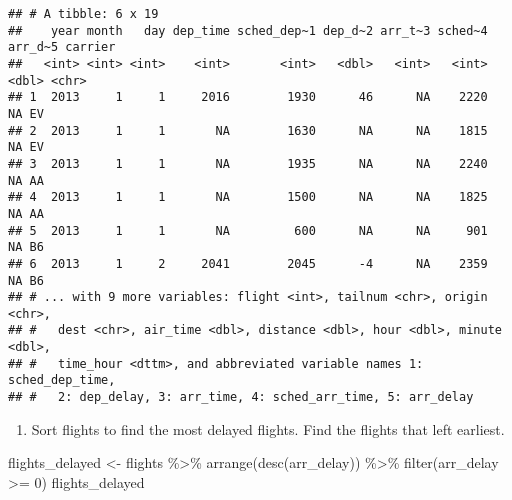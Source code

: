 \documentclass[
]{article}
\newenvironment{Shaded}{\begin{snugshade}}{\end{snugshade}}
\newcommand{\DecValTok}[1]{\textcolor[rgb]{0.00,0.00,0.81}{#1}}
\newcommand{\FunctionTok}[1]{\textcolor[rgb]{0.00,0.00,0.00}{#1}}
\newcommand{\NormalTok}[1]{#1}
\newcommand{\OtherTok}[1]{\textcolor[rgb]{0.56,0.35,0.01}{#1}}
\newcommand{\SpecialCharTok}[1]{\textcolor[rgb]{0.00,0.00,0.00}{#1}}
\providecommand{\tightlist}{%
  \setlength{\itemsep}{0pt}\setlength{\parskip}{0pt}}
\begin{document}
\begin{verbatim}
## # A tibble: 6 x 19
##    year month   day dep_time sched_dep~1 dep_d~2 arr_t~3 sched~4 arr_d~5 carrier
##   <int> <int> <int>    <int>       <int>   <dbl>   <int>   <int>   <dbl> <chr>  
## 1  2013     1     1     2016        1930      46      NA    2220      NA EV     
## 2  2013     1     1       NA        1630      NA      NA    1815      NA EV     
## 3  2013     1     1       NA        1935      NA      NA    2240      NA AA     
## 4  2013     1     1       NA        1500      NA      NA    1825      NA AA     
## 5  2013     1     1       NA         600      NA      NA     901      NA B6     
## 6  2013     1     2     2041        2045      -4      NA    2359      NA B6     
## # ... with 9 more variables: flight <int>, tailnum <chr>, origin <chr>,
## #   dest <chr>, air_time <dbl>, distance <dbl>, hour <dbl>, minute <dbl>,
## #   time_hour <dttm>, and abbreviated variable names 1: sched_dep_time,
## #   2: dep_delay, 3: arr_time, 4: sched_arr_time, 5: arr_delay
\end{verbatim}

\begin{enumerate}
\def\labelenumi{\arabic{enumi}.}
\setcounter{enumi}{6}
\tightlist
\item
  Sort flights to find the most delayed flights. Find the flights that
  left earliest.
\end{enumerate}

\begin{Shaded}
\begin{Highlighting}[]
\NormalTok{flights\_delayed }\OtherTok{\textless{}{-}}\NormalTok{ flights }\SpecialCharTok{\%\textgreater{}\%} \FunctionTok{arrange}\NormalTok{(}\FunctionTok{desc}\NormalTok{(arr\_delay)) }\SpecialCharTok{\%\textgreater{}\%} \FunctionTok{filter}\NormalTok{(arr\_delay }\SpecialCharTok{\textgreater{}=} \DecValTok{0}\NormalTok{)}
\NormalTok{flights\_delayed}
\end{Highlighting}
\end{Shaded}
\end{document}
